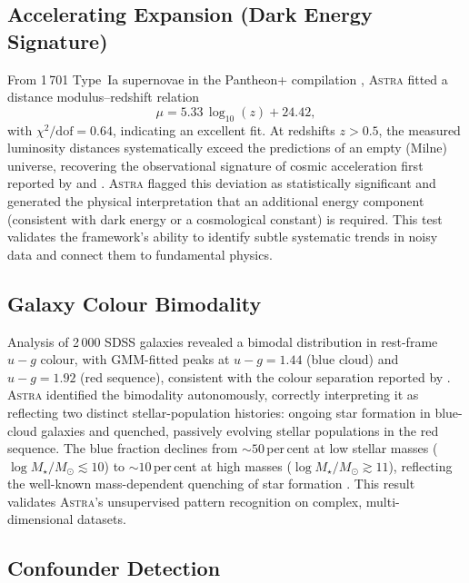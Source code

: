 \documentclass[usenatbib]{rasti}
\newcommand{\astra}{\textsc{Astra}\xspace}
\begin{document}
\subsection{Accelerating Expansion (Dark Energy Signature)}
\label{sec:live:sne}

From 1\,701 Type~Ia supernovae in the Pantheon+ compilation \citep{Brout2022}, \astra fitted a distance modulus--redshift relation
\begin{equation}
  \mu = 5.33\,\log_{10}(z) + 24.42,
  \label{eq:sne}
\end{equation}
with $\chi^{2}/\mathrm{dof} = 0.64$, indicating an excellent fit.
At redshifts $z > 0.5$, the measured luminosity distances systematically exceed the predictions of an empty (Milne) universe, recovering the observational signature of cosmic acceleration first reported by \citet{Riess1998} and \citet{Perlmutter1999}.
\astra flagged this deviation as statistically significant and generated the physical interpretation that an additional energy component (consistent with dark energy or a cosmological constant) is required.
This test validates the framework's ability to identify subtle systematic trends in noisy data and connect them to fundamental physics.

\subsection{Galaxy Colour Bimodality}
\label{sec:live:bimodality}

Analysis of 2\,000 SDSS galaxies revealed a bimodal distribution in rest-frame $u{-}g$ colour, with GMM-fitted peaks at $u{-}g = 1.44$ (blue cloud) and $u{-}g = 1.92$ (red sequence), consistent with the colour separation reported by \citet{Strateva2001}.
\astra identified the bimodality autonomously, correctly interpreting it as reflecting two distinct stellar-population histories: ongoing star formation in blue-cloud galaxies and quenched, passively evolving stellar populations in the red sequence.
The blue fraction declines from ${\sim}50$\,per\,cent at low stellar masses ($\log M_{\star}/M_{\odot} \lesssim 10$) to ${\sim}10$\,per\,cent at high masses ($\log M_{\star}/M_{\odot} \gtrsim 11$), reflecting the well-known mass-dependent quenching of star formation \citep{Peng2010}.
This result validates \astra's unsupervised pattern recognition on complex, multi-dimensional datasets.

\subsection{Confounder Detection}
\label{sec:live:confounders}
\end{document}

